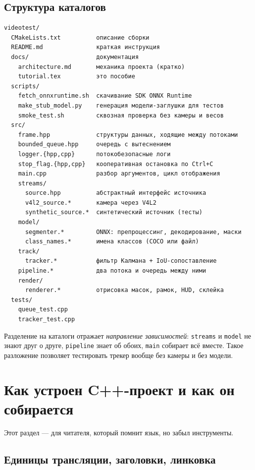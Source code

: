 \documentclass[11pt,a4paper]{article}
\theoremstyle{definition}
\theoremstyle{remark}
\begin{document}
\subsection{Структура каталогов}

\begin{lstlisting}[style=shell]
videotest/
  CMakeLists.txt          описание сборки
  README.md               краткая инструкция
  docs/                   документация
    architecture.md       механика проекта (кратко)
    tutorial.tex          это пособие
  scripts/
    fetch_onnxruntime.sh  скачивание SDK ONNX Runtime
    make_stub_model.py    генерация модели-заглушки для тестов
    smoke_test.sh         сквозная проверка без камеры и весов
  src/
    frame.hpp             структуры данных, ходящие между потоками
    bounded_queue.hpp     очередь с вытеснением
    logger.{hpp,cpp}      потокобезопасные логи
    stop_flag.{hpp,cpp}   кооперативная остановка по Ctrl+C
    main.cpp              разбор аргументов, цикл отображения
    streams/
      source.hpp          абстрактный интерфейс источника
      v4l2_source.*       камера через V4L2
      synthetic_source.*  синтетический источник (тесты)
    model/
      segmenter.*         ONNX: препроцессинг, декодирование, маски
      class_names.*       имена классов (COCO или файл)
    track/
      tracker.*           фильтр Калмана + IoU-сопоставление
    pipeline.*            два потока и очередь между ними
    render/
      renderer.*          отрисовка масок, рамок, HUD, склейка
  tests/
    queue_test.cpp
    tracker_test.cpp
\end{lstlisting}

Разделение на каталоги отражает \emph{направление зависимостей}: \texttt{streams}
и \texttt{model} не знают друг о друге, \texttt{pipeline} знает об обоих,
\texttt{main} собирает всё вместе. Такое разложение позволяет тестировать
трекер вообще без камеры и без модели.

\section{Как устроен C++-проект и как он собирается}

Этот раздел --- для читателя, который помнит язык, но забыл инструменты.

\subsection{Единицы трансляции, заголовки, линковка}
\end{document}
